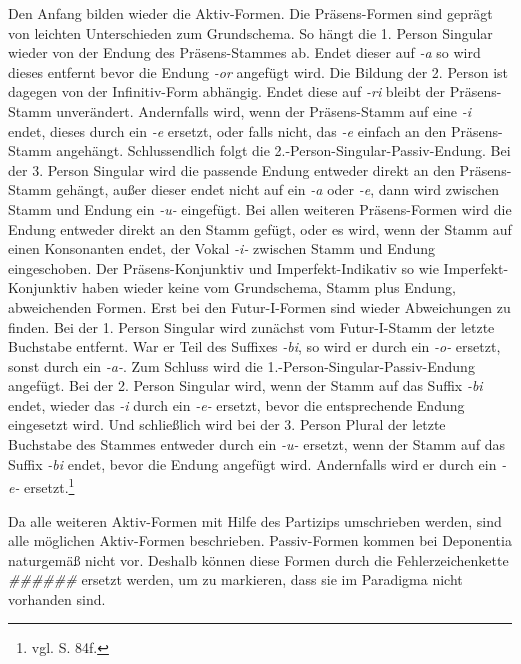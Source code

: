 Den Anfang bilden wieder die Aktiv-Formen. Die Präsens-Formen sind geprägt von leichten Unterschieden zum Grundschema. So hängt die 1. Person Singular wieder von der Endung des Präsens-Stammes ab. Endet dieser auf \textit{-a} so wird dieses entfernt bevor die Endung \textit{-or} angefügt wird. Die Bildung der 2. Person ist dagegen von der Infinitiv-Form abhängig. Endet diese auf \textit{-ri} bleibt der Präsens-Stamm unverändert. Andernfalls wird, wenn der Präsens-Stamm auf eine \textit{-i} endet, dieses durch ein \textit{-e} ersetzt, oder falls nicht, das \textit{-e} einfach an den Präsens-Stamm angehängt. Schlussendlich folgt die 2.-Person-Singular-Passiv-Endung. Bei der 3. Person Singular wird die passende Endung entweder direkt an den Präsens-Stamm gehängt, außer dieser endet nicht auf ein \textit{-a} oder \textit{-e}, dann wird zwischen Stamm und Endung ein \textit{-u-} eingefügt. Bei allen weiteren Präsens-Formen wird die Endung entweder direkt an den Stamm gefügt, oder es wird, wenn der Stamm auf einen Konsonanten endet, der Vokal \textit{-i-} zwischen Stamm und Endung eingeschoben. Der Präsens-Konjunktiv und Imperfekt-Indikativ so wie Imperfekt-Konjunktiv haben wieder keine vom Grundschema, Stamm plus Endung, abweichenden Formen. Erst bei den Futur-I-Formen sind wieder Abweichungen zu finden. Bei der 1. Person Singular wird zunächst vom Futur-I-Stamm der letzte Buchstabe entfernt. War er Teil des Suffixes \textit{-bi}, so wird er durch ein \textit{-o-} ersetzt, sonst durch ein \textit{-a-}. Zum Schluss wird die 1.-Person-Singular-Passiv-Endung angefügt. Bei der 2. Person Singular wird, wenn der Stamm auf das Suffix \textit{-bi} endet, wieder das \textit{-i} durch ein \textit{-e-} ersetzt, bevor die entsprechende Endung eingesetzt wird. Und schließlich wird bei der 3. Person Plural der letzte Buchstabe des Stammes entweder durch ein \textit{-u-} ersetzt, wenn der Stamm auf das Suffix \textit{-bi} endet, bevor die Endung angefügt wird. Andernfalls wird er durch ein \textit{-e-} ersetzt.\footnote{vgl. \cite{BAYER-LINDAUER1994} S. 84f.} \par
Da alle weiteren Aktiv-Formen mit Hilfe des Partizips umschrieben werden, sind alle möglichen Aktiv-Formen beschrieben. Passiv-Formen kommen bei Deponentia naturgemäß nicht vor. Deshalb können diese Formen durch die Fehlerzeichenkette \textit{\#\#\#\#\#\#} ersetzt werden, um zu markieren, dass sie im Paradigma nicht vorhanden sind. \par
